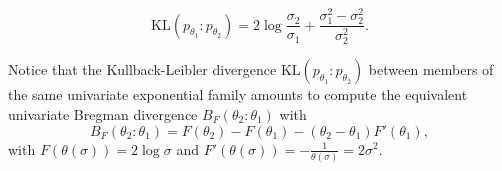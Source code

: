\documentclass{article}
\def\KL{\mathrm{KL}}
\begin{document}
\begin{equation}
\boxed{ \KL(p_{\theta_1}:p_{\theta_2}) = 2\log \frac{\sigma_2}{\sigma_1}+\frac{\sigma_1^2-\sigma_2^2}{\sigma_2^2}.}
\end{equation}


Notice that the Kullback-Leibler divergence $\KL(p_{\theta_1}:p_{\theta_2})$ between members of the same univariate exponential family amounts to compute the equivalent univariate Bregman divergence
$B_F(\theta_2:\theta_1)$ with
$$
B_F(\theta_2:\theta_1)=F(\theta_2)-F(\theta_1)-(\theta_2-\theta_1) F'(\theta_1),
$$
with $F(\theta(\sigma))=2\log\sigma$ and $F'(\theta(\sigma))=-\frac{1}{\theta(\sigma)}=2\sigma^2$.





\end{document}
